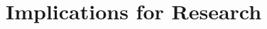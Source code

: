 \documentclass[trackingWork]{subfiles}
\begin{document}
\section{Implications for Research}
\end{document}
